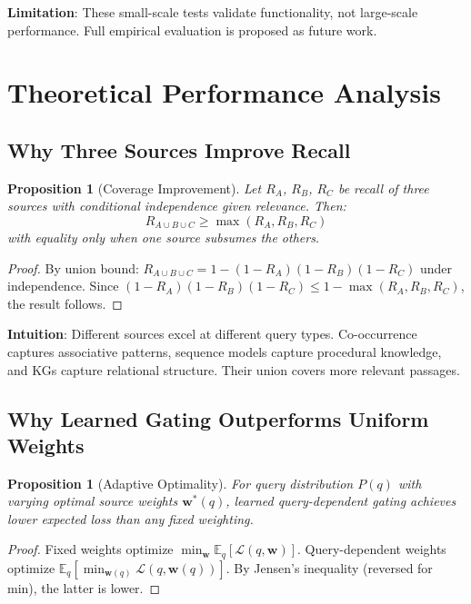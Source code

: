 \documentclass[10pt,twocolumn]{article}
\newtheorem{proposition}[theorem]{Proposition}
\begin{document}
\textbf{Limitation}: These small-scale tests validate functionality, not large-scale performance. Full empirical evaluation is proposed as future work.

\section{Theoretical Performance Analysis}
\label{sec:theoretical_analysis}

\subsection{Why Three Sources Improve Recall}

\begin{proposition}[Coverage Improvement]
\label{prop:coverage}
Let $R_A$, $R_B$, $R_C$ be recall of three sources with conditional independence given relevance. Then:
\begin{equation}
R_{A \cup B \cup C} \geq \max(R_A, R_B, R_C)
\end{equation}
with equality only when one source subsumes the others.
\end{proposition}

\begin{proof}
By union bound: $R_{A \cup B \cup C} = 1 - (1-R_A)(1-R_B)(1-R_C)$ under independence. Since $(1-R_A)(1-R_B)(1-R_C) \leq 1 - \max(R_A, R_B, R_C)$, the result follows.
\end{proof}

\textbf{Intuition}: Different sources excel at different query types. Co-occurrence captures associative patterns, sequence models capture procedural knowledge, and KGs capture relational structure. Their union covers more relevant passages.

\subsection{Why Learned Gating Outperforms Uniform Weights}

\begin{proposition}[Adaptive Optimality]
\label{prop:adaptive}
For query distribution $P(q)$ with varying optimal source weights $\mathbf{w}^*(q)$, learned query-dependent gating achieves lower expected loss than any fixed weighting.
\end{proposition}

\begin{proof}
Fixed weights optimize $\min_\mathbf{w} \mathbb{E}_q[\mathcal{L}(q, \mathbf{w})]$. Query-dependent weights optimize $\mathbb{E}_q[\min_{\mathbf{w}(q)} \mathcal{L}(q, \mathbf{w}(q))]$. By Jensen's inequality (reversed for min), the latter is lower.
\end{proof}
\end{document}
